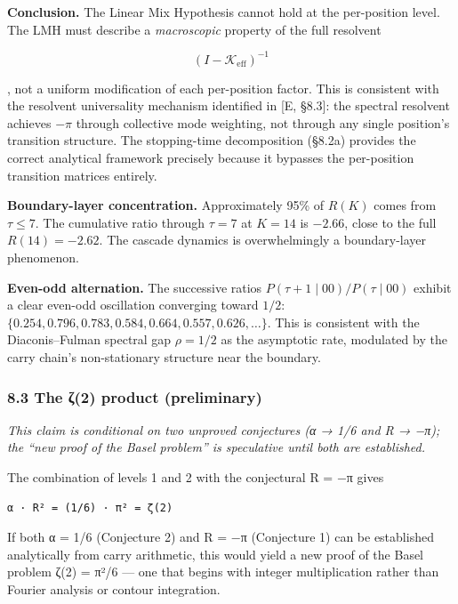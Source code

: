 \documentclass[
  11pt,
]{article}
\begin{document}
\textbf{Conclusion.} The Linear Mix Hypothesis cannot hold at the per-position
level. The LMH must describe a \emph{macroscopic} property of the full resolvent

\[(I - \mathcal{K}_{\text{eff}})^{-1}\]

, not a uniform modification of each per-position factor. This is consistent
with the resolvent universality mechanism identified in {[}E, §8.3{]}: the
spectral resolvent achieves \(-\pi\) through collective mode weighting, not
through any single position's transition structure. The stopping-time
decomposition (§8.2a) provides the correct analytical framework precisely
because it bypasses the per-position transition matrices entirely.

\textbf{Boundary-layer concentration.} Approximately 95\% of \(R(K)\) comes from
\(\tau \leq 7\). The cumulative ratio through \(\tau = 7\) at \(K = 14\) is
\(-2.66\), close to the full \(R(14) = -2.62\). The cascade dynamics is
overwhelmingly a boundary-layer phenomenon.

\textbf{Even-odd alternation.} The successive ratios
\(P(\tau+1 \mid 00)/P(\tau \mid 00)\) exhibit a clear even-odd oscillation
converging toward \(1/2\):
\(\lbrace{}0.254, 0.796, 0.783, 0.584, 0.664, 0.557, 0.626, \ldots\rbrace{}\).
This is consistent with the Diaconis--Fulman spectral gap \(\rho = 1/2\) as the
asymptotic rate, modulated by the carry chain's non-stationary structure near
the boundary.

\subsubsection{8.3 The ζ(2) product
(preliminary)}\label{the-ux3b62-product-preliminary}

\emph{This claim is conditional on two unproved conjectures (α → 1/6 and R →
−π); the ``new proof of the Basel problem'' is speculative until both are
established.}

The combination of levels 1 and 2 with the conjectural R = −π gives

\begin{verbatim}
α · R² = (1/6) · π² = ζ(2)
\end{verbatim}

If both α = 1/6 (Conjecture 2) and R = −π (Conjecture 1) can be established
analytically from carry arithmetic, this would yield a new proof of the Basel
problem ζ(2) = π²/6 --- one that begins with integer multiplication rather than
Fourier analysis or contour integration.
\end{document}
